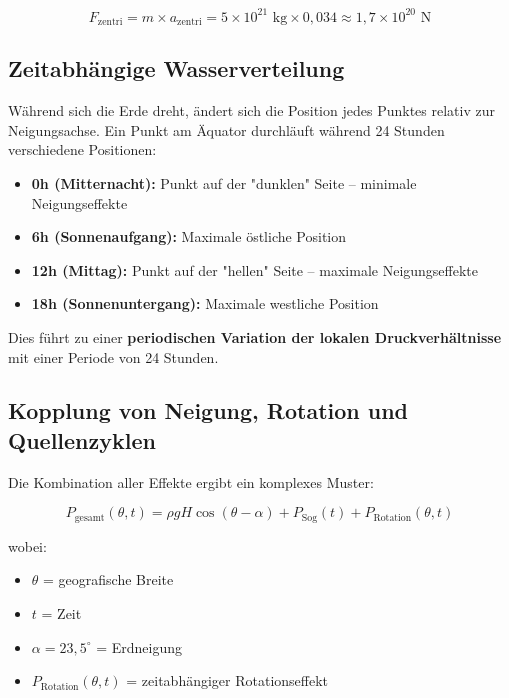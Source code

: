 ﻿\documentclass[12pt,a4paper]{report}
\begin{document}
\begin{equation}
	F_{\text{zentri}} = m \times a_{\text{zentri}} = 5 \times 10^{21} \text{ kg} \times 0{,}034 \approx 1{,}7 \times 10^{20} \text{ N}
\end{equation}

\subsection{Zeitabhängige Wasserverteilung}

Während sich die Erde dreht, ändert sich die Position jedes Punktes relativ zur Neigungsachse. Ein Punkt am Äquator durchläuft während 24 Stunden verschiedene Positionen:

\begin{itemize}
	\item \textbf{0h (Mitternacht):} Punkt auf der "dunklen" Seite -- minimale Neigungseffekte
	\item \textbf{6h (Sonnenaufgang):} Maximale östliche Position
	\item \textbf{12h (Mittag):} Punkt auf der "hellen" Seite -- maximale Neigungseffekte  
	\item \textbf{18h (Sonnenuntergang):} Maximale westliche Position
\end{itemize}

Dies führt zu einer \textbf{periodischen Variation der lokalen Druckverhältnisse} mit einer Periode von 24 Stunden.

\subsection{Kopplung von Neigung, Rotation und Quellenzyklen}

Die Kombination aller Effekte ergibt ein komplexes Muster:

\begin{equation}
	P_{\text{gesamt}}(\theta, t) = \rho g H \cos(\theta - \alpha) + P_{\text{Sog}}(t) + P_{\text{Rotation}}(\theta, t)
\end{equation}

wobei:
\begin{itemize}
	\item $\theta$ = geografische Breite
	\item $t$ = Zeit
	\item $\alpha = 23{,}5^\circ$ = Erdneigung
	\item $P_{\text{Rotation}}(\theta, t)$ = zeitabhängiger Rotationseffekt
\end{itemize}
\end{document}

